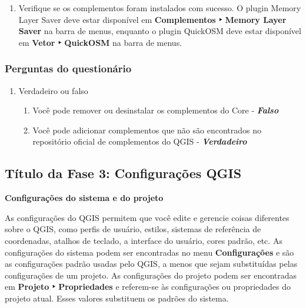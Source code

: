 \documentclass[
]{book}
\providecommand{\tightlist}{%
  \setlength{\itemsep}{0pt}\setlength{\parskip}{0pt}}
\begin{document}
\begin{enumerate}
\def\labelenumi{\arabic{enumi}.}
\setcounter{enumi}{2}
\tightlist
\item
  Verifique se os complementos foram instalados com sucesso. O plugin Memory Layer Saver deve estar disponível em \textbf{Complementos ‣ Memory Layer Saver} na barra de menus, enquanto o plugin QuickOSM deve estar disponível em \textbf{Vetor ‣ QuickOSM} na barra de menus.
\end{enumerate}

\hypertarget{perguntas-do-questionuxe1rio-3}{%
\subsubsection{\texorpdfstring{\textbf{Perguntas do questionário}}{Perguntas do questionário}}\label{perguntas-do-questionuxe1rio-3}}

\begin{enumerate}
\def\labelenumi{\arabic{enumi}.}
\tightlist
\item
  Verdadeiro ou falso

  \begin{enumerate}
  \def\labelenumii{\arabic{enumii}.}
  \tightlist
  \item
    Você pode remover ou desinstalar os complementos do Core - \textbf{\emph{Falso}}
  \item
    Você pode adicionar complementos que não são encontrados no repositório oficial de complementos do QGIS - \textbf{\emph{Verdadeiro}}
  \end{enumerate}
\end{enumerate}

\hypertarget{tuxedtulo-da-fase-3-configurauxe7uxf5es-qgis}{%
\subsection{Título da Fase 3: Configurações QGIS}\label{tuxedtulo-da-fase-3-configurauxe7uxf5es-qgis}}

\textbf{Configurações do sistema e do projeto}

As configurações do QGIS permitem que você edite e gerencie coisas diferentes sobre o QGIS, como perfis de usuário, estilos, sistemas de referência de coordenadas, atalhos de teclado, a interface do usuário, cores padrão, etc. As configurações do sistema podem ser encontradas no menu \textbf{Configurações} e são as configurações padrão usadas pelo QGIS, a menos que sejam substituídas pelas configurações de um projeto. As configurações do projeto podem ser encontradas em \textbf{Projeto ‣ Propriedades} e referem-se às configurações ou propriedades do projeto atual. Esses valores substituem os padrões do sistema.
\end{document}
